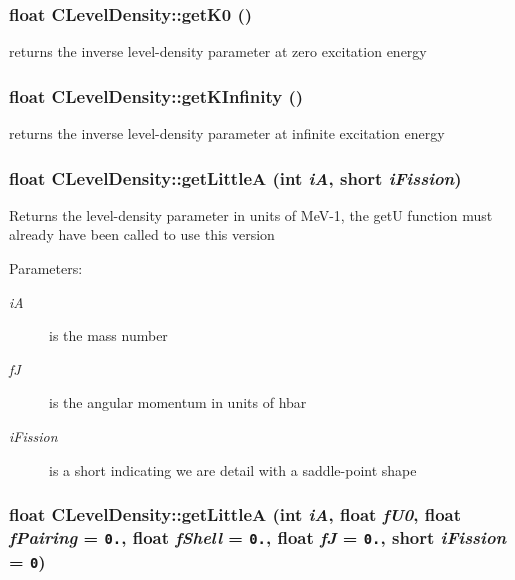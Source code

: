\subsubsection{\setlength{\rightskip}{0pt plus 5cm}float CLevel\-Density::get\-K0 ()\hspace{0.3cm}{\tt  [static]}}\label{classCLevelDensity_e5bec4da4e010b19a0d092056fecaf7f}


returns the inverse level-density parameter at zero excitation energy 
\subsubsection{\setlength{\rightskip}{0pt plus 5cm}float CLevel\-Density::get\-KInfinity ()\hspace{0.3cm}{\tt  [static]}}\label{classCLevelDensity_f27496e4e8611b3509a7e70efa33508b}


returns the inverse level-density parameter at infinite excitation energy 
\subsubsection{\setlength{\rightskip}{0pt plus 5cm}float CLevel\-Density::get\-Little\-A (int {\em i\-A}, short {\em i\-Fission})}\label{classCLevelDensity_8cbed36fb5a48843a622183e803872b6}


Returns the level-density parameter in units of Me\-V-1, the get\-U function must already have been called to use this version \begin{Desc}
\item[Parameters:]
\begin{description}
\item[{\em i\-A}]is the mass number \item[{\em f\-J}]is the angular momentum in units of hbar \item[{\em i\-Fission}]is a short indicating we are detail with a saddle-point shape \end{description}
\end{Desc}
\subsubsection{\setlength{\rightskip}{0pt plus 5cm}float CLevel\-Density::get\-Little\-A (int {\em i\-A}, float {\em f\-U0}, float {\em f\-Pairing} = {\tt 0.}, float {\em f\-Shell} = {\tt 0.}, float {\em f\-J} = {\tt 0.}, short {\em i\-Fission} = {\tt 0})}\label{classCLevelDensity_58fc95dcb009f6594ccc069026c03e9c}


